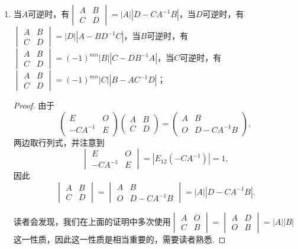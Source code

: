 \begin{enumerate}
    \item 当$A$可逆时，有$\begin{vmatrix}
                  A & B \\ C & D
              \end{vmatrix} = |A||D-CA^{-1}B|$，当$D$可逆时，有$\begin{vmatrix}
                  A & B \\ C & D
              \end{vmatrix} = |D||A-BD^{-1}C|$，当$B$可逆时，有$\begin{vmatrix}
                  A & B \\ C & D
              \end{vmatrix} = (-1)^{mn}|B||C-DB^{-1}A|$，当$C$可逆时，有$\begin{vmatrix}
                  A & B \\ C & D
              \end{vmatrix} = (-1)^{mn}|C||B-AC^{-1}D|$；
          \begin{proof}
              由于
              \[\begin{pmatrix}
                      E & O \\ -CA^{-1} & E
                  \end{pmatrix}\begin{pmatrix}
                      A & B \\ C & D
                  \end{pmatrix}= \begin{pmatrix}
                      A & B \\ O & D-CA^{-1}B
                  \end{pmatrix},\]
              两边取行列式，并注意到
              \[\begin{vmatrix}
                      E & O \\ -CA^{-1} & E
                  \end{vmatrix} = |E_{12}(-CA^{-1})| = 1,\]
              因此
              \[\begin{vmatrix}
                      A & B \\ C & D
                  \end{vmatrix}=\begin{vmatrix}
                      A & B \\ O & D-CA^{-1}B
                  \end{vmatrix}=|A||D-CA^{-1}B|.\]

              读者会发现，我们在上面的证明中多次使用$\begin{vmatrix}
                      A & O \\ C & B
                  \end{vmatrix} = \begin{vmatrix}
                      A & D \\ O & B
                  \end{vmatrix} = |A||B|$这一性质，因此这一性质是相当重要的，需要读者熟悉.


\end{proof}
\end{enumerate}
